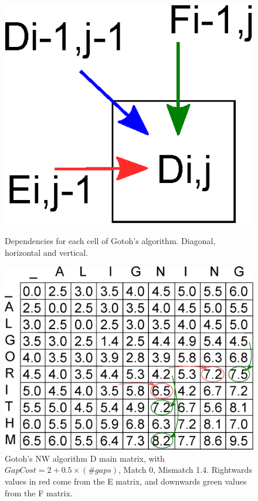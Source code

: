 \begin{figure}[htb!]
  \begin{minipage}{0.26\linewidth}
	\centering
	\includegraphics[scale=0.5]{img-align/nw-affine-gotoh-deps.eps}
	\caption[Gotoh's dependencies] {Dependencies for each cell of Gotoh's algorithm. Diagonal, horizontal and vertical.}
	\label{nw-affine-gotoh-deps}
  \end{minipage}
  \hspace{0.04\linewidth}
  \begin{minipage}{0.7\linewidth}
	\centering
	\includegraphics[scale=0.5]{img-align/nw-affine-gotoh-Dmat.eps}
	\caption[Gotoh's main matrix] {Gotoh's \ac{NW} algorithm D main matrix, with $GapCost = 2+0.5 \times (\#gaps)$, Match 0, Mismatch 1.4. Rightwards values in red come from the E matrix, and downwards green values from the F matrix.}
	\label{nw-affine-gotoh-Dmat}
  \end{minipage}
\end{figure} 


